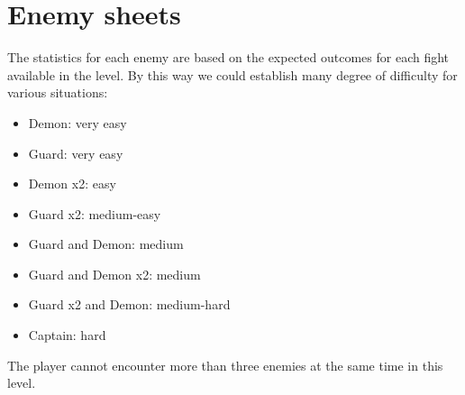 \section{Enemy sheets}

The statistics for each enemy are based on the expected outcomes for each fight available in the level. By this way we could establish many degree of difficulty for various situations:
\begin{itemize}
\item Demon: very easy
\item Guard: very easy
\item Demon x2: easy
\item Guard x2: medium-easy
\item Guard and Demon: medium
\item Guard and Demon x2: medium
\item Guard x2 and Demon: medium-hard
\item Captain: hard
\end{itemize}

The player cannot encounter more than three enemies at the same time in this level.

